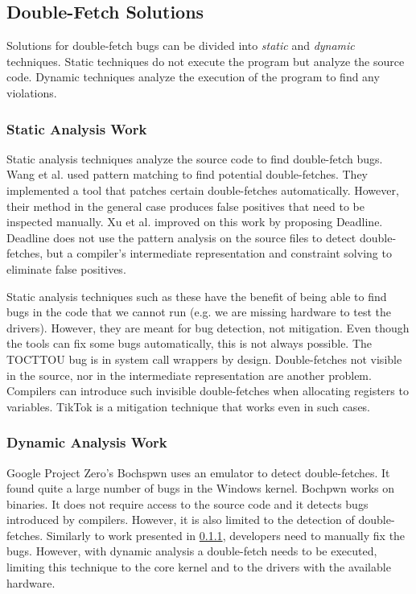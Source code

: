 \subsection{Double-Fetch Solutions}

Solutions for double-fetch bugs can be divided into \emph{static} and
\emph{dynamic} techniques. Static techniques do not execute the program but
analyze the source code. Dynamic techniques analyze the execution of the
program to find any violations.

\subsubsection{Static Analysis Work}
\label{subsec:dfstatic}
Static analysis techniques analyze the source code to find double-fetch bugs.
Wang et al. \cite{wang2017double} used pattern matching to find potential
double-fetches. They implemented a tool that patches certain double-fetches
automatically. However, their method in the general case produces false
positives that need to be inspected manually. Xu et al.\cite{xu2018precise}
improved on this work by proposing Deadline. Deadline does not use the pattern 
analysis on the source files to detect double-fetches, but a compiler's
intermediate representation and constraint solving to eliminate false positives.

Static analysis techniques such as these have the benefit of being able to find
bugs in the code that we cannot run (e.g. we are missing hardware to test the
drivers). However, they are meant for bug detection, not mitigation. Even though
the tools can fix some bugs automatically, this is not always possible. The
TOCTTOU bug is in system call wrappers by design. Double-fetches not visible in
the source, nor in the intermediate representation are another problem.
Compilers can introduce such invisible double-fetches when allocating registers
to variables. TikTok is a mitigation technique that works even in such cases.


\subsubsection{Dynamic Analysis Work}
Google Project Zero's Bochspwn \cite{jurczyk2013bochspwn} uses an emulator to
detect double-fetches. It found quite a large number of bugs in the Windows
kernel. Bochpwn works on binaries. It does not require access to the source code
and it detects bugs introduced by compilers. However, it is also limited to the
detection of double-fetches. Similarly to work presented in 
\cref{subsec:dfstatic}, developers need to manually fix the bugs. However, with
dynamic analysis a double-fetch needs to be executed, limiting this
technique to the core kernel and to the drivers with the available hardware.

